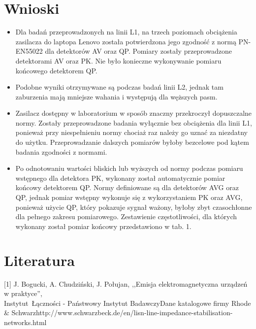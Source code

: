\documentclass[12pt, a4paper, oneside]{article}
\begin{document}
\section{Wnioski}
\begin{itemize}
\item Dla badań przeprowadzonych na linii L1, na trzech poziomach obciążenia zasilacza do laptopa Lenovo została potwierdzona jego zgodność z normą PN-EN55022 dla detektorów AV oraz QP. Pomiary zostały przeprowadzone detektorami AV oraz PK. Nie było konieczne wykonywanie pomiaru końcowego detektorem QP.
\item Podobne wyniki otrzymywane są podczas badań linii L2, jednak tam zaburzenia mają mniejsze wahania i występują dla węższych pasm.
\item Zasilacz dostępny w laboratorium w sposób znaczny przekroczył dopuszczalne normy. Zostały przeprowadzone badania wyłącznie bez obciążenia dla linii L1, ponieważ przy niespełnieniu normy chociaż raz należy go uznać za niezdatny do użytku. Przeprowadzanie dalszych pomiarów byłoby bezcelowe pod kątem badania zgodności z normami.
\item Po odnotowaniu wartości bliskich lub wyższych od normy podczas pomiaru wstępnego dla detektora PK, wykonany został automatycznie pomiar końcowy detektorem QP. Normy definiowane są dla detektorów AVG oraz QP, jednak pomiar wstępny wykonuje się z wykorzystaniem PK oraz AVG, ponieważ użycie QP, który pokazuje sygnał ważony, byłoby zbyt czasochłonne dla pełnego zakresu pomiarowego. Zestawienie częstotliwości, dla których wykonany został pomiar końcowy przedstawiono w tab. 1.
\end{itemize}
\clearpage
\section{Literatura}
[1] J. Bogucki, A. Chudziński, J. Połujan, ,,Emisja elektromagnetyczna urządzeń w praktyce'',\\ Instytut~Łączności - Państwowy Instytut Badawczy\newline\newline
[2] Dane katalogowe firmy Rhode \& Schwarz\newline\newline
[3] http://www.schwarzbeck.de/en/lisn-line-impedance-stabilisation-networks.html \newline\newline
\end{document}
